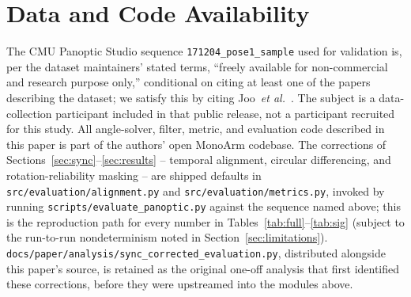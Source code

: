 \documentclass[conference]{IEEEtran}
\begin{document}
\section*{Data and Code Availability}
The CMU Panoptic Studio sequence \texttt{171204\_pose1\_sample} used for
validation is, per the dataset maintainers' stated terms, ``freely
available for non-commercial and research purpose only,'' conditional on
citing at least one of the papers describing the dataset; we satisfy
this by citing Joo~\textit{et al.}~\cite{joo2015panoptic}. The subject is
a data-collection participant included in that public release, not a
participant recruited for this study. All angle-solver, filter, metric,
and evaluation code described in this paper is part of the authors' open
MonoArm codebase. The corrections of
Sections~\ref{sec:sync}--\ref{sec:results} -- temporal alignment,
circular differencing, and rotation-reliability masking -- are shipped
defaults in \texttt{src/evaluation/alignment.py} and
\texttt{src/evaluation/metrics.py}, invoked by running
\texttt{scripts/evaluate\_panoptic.py} against the sequence named above;
this is the reproduction path for every number in
Tables~\ref{tab:full}--\ref{tab:sig} (subject to the run-to-run
nondeterminism noted in Section~\ref{sec:limitations}).
\texttt{docs/paper/analysis/sync\_corrected\_evaluation.py}, distributed
alongside this paper's source, is retained as the original one-off
analysis that first identified these corrections, before they were
upstreamed into the modules above.
\end{document}
